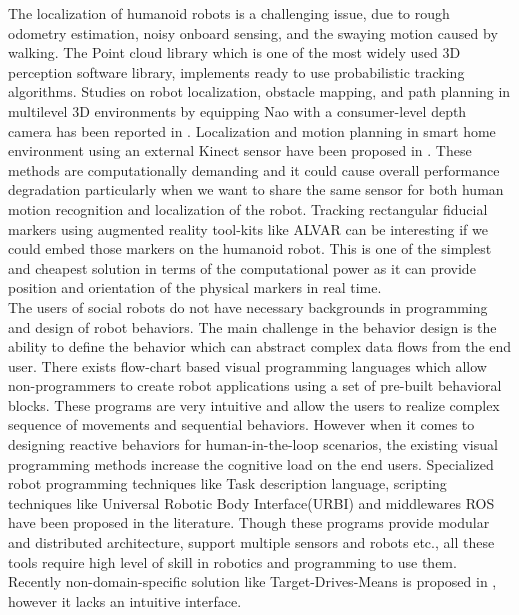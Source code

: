 \documentclass{llncs}
\begin{document}
	The localization of humanoid robots is a challenging issue, due to rough odometry estimation, noisy onboard sensing, and the swaying motion caused by walking\cite{Cervera2012}. The Point cloud library\cite{RusuPCL11} which is one of the most widely used 3D perception software library, implements ready to use probabilistic tracking algorithms\cite{RUeda2012}. Studies on robot localization, obstacle mapping, and path planning in multilevel 3D environments by equipping Nao with a consumer-level depth camera has been reported in \cite{Maier2012}. Localization and motion planning in smart home environment using an external Kinect sensor have been proposed in \cite{Cervera2012}. These methods are computationally demanding and it could cause overall performance degradation particularly when we want to share the same sensor for both human motion recognition and localization of the robot. Tracking rectangular fiducial markers using  augmented reality tool-kits like ALVAR\cite{ALVAR} can be interesting if we could embed those markers on the humanoid robot. This is one of the simplest and cheapest solution in terms of the computational power as it can provide position and orientation of the physical markers in real time.\\
	
	The users of social robots do not have necessary backgrounds in programming and design of robot behaviors. The main challenge in the behavior design is the ability to define the behavior which can abstract complex data flows from the end user. There exists flow-chart based visual programming languages\cite{Choregraphe} which allow non-programmers to create robot applications using a set of pre-built behavioral blocks. These programs are very intuitive and allow the users to realize complex sequence of movements and sequential behaviors. However when it comes to designing reactive behaviors for human-in-the-loop scenarios, the existing visual programming methods increase the cognitive load on the end users. Specialized robot programming techniques like Task description language\cite{Simmons724883}, scripting techniques like Universal Robotic Body Interface(URBI)\cite{Baillie4814281} and middlewares ROS\cite{quigley2009ros} have been proposed in the literature. Though these programs provide modular and distributed architecture, support multiple sensors and robots etc., all these tools require high level of skill in robotics and programming to use them. Recently non-domain-specific solution like Target-Drives-Means is proposed in \cite{BerenzTDM2014}, however it lacks an intuitive interface.\\
	
\end{document}
